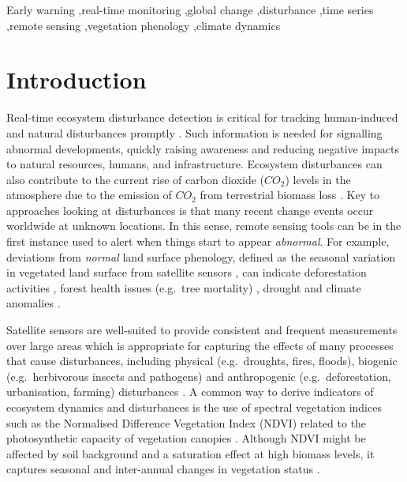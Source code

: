 \documentclass[authoryear,preprint,review,10pt]{elsarticle}
\begin{document}
\begin{frontmatter}
\begin{keyword}
Early warning \sep real-time monitoring \sep global change \sep disturbance \sep time series \sep remote sensing \sep vegetation phenology \sep climate dynamics
\end{keyword}

\end{frontmatter}

\newpage
\section{Introduction}

Real-time ecosystem disturbance detection is critical for tracking human-induced and natural disturbances promptly \citep{Asner:2011fa}. Such
information is needed for signalling abnormal developments, quickly raising awareness and reducing negative impacts to natural resources, humans, and infrastructure. Ecosystem disturbances can also contribute to the current rise of carbon dioxide ($CO_2$) levels in the atmosphere due to the emission of $CO_2$ from terrestrial biomass loss \citep{Potter2003,Schimel:2001vi}. 
Key to approaches looking at disturbances is that many recent change events occur worldwide at unknown locations. In this sense, remote sensing tools can be in the first instance used to alert when things start to appear \emph{abnormal}. For example, deviations from \emph{normal} land surface phenology, defined as the seasonal variation in vegetated land surface from satellite sensors \citep{White2009}, can indicate deforestation activities \citep{Asner:2011fa}, forest health issues (e.g.\ tree mortality) \citep{Hargrove2009, Stone2008, Verbesselt2009}, drought and climate anomalies \citep{Funk:2009vf,Vrieling:2011da}.

Satellite sensors are well-suited to provide consistent and frequent measurements over large areas which is appropriate for capturing the effects of many processes that cause disturbances, including physical (e.g.\ droughts, fires, floods), biogenic (e.g.\ herbivorous insects and pathogens) and anthropogenic (e.g.\ deforestation, urbanisation, farming) disturbances \citep{Jin2005, Potter2003}. A common way to derive indicators of ecosystem dynamics and disturbances is the use of spectral vegetation indices such as the Normalised Difference Vegetation Index (NDVI) related to the photosynthetic capacity of vegetation canopies \citep{Myneni1995, Pettorelli:2005ed, Potter2003}.  Although NDVI might be affected by soil background and a saturation effect at high biomass levels, it captures seasonal and inter-annual changes in vegetation status \citep{Huete2002,Myneni:1997ur}.%
\end{document}
